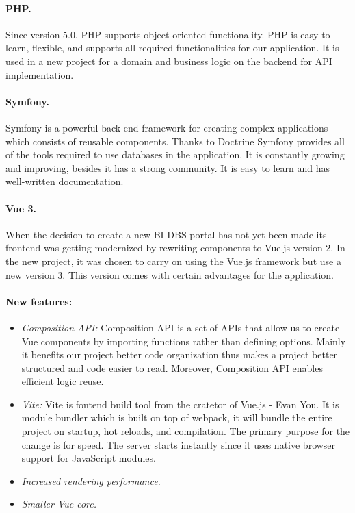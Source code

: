 \paragraph*{PHP.} Since version 5.0, PHP supports object-oriented functionality\cite{php-oop}. PHP is easy to learn, flexible, and supports all required functionalities for our application. It is used in a new project for a domain and business logic on the backend for API implementation.

\paragraph*{Symfony.} Symfony is a powerful back-end framework for creating complex applications which consists of reusable components.\cite{symphony-doc} Thanks to Doctrine Symfony provides all of the tools required to use databases in the application. It is constantly growing and improving, besides it has a strong community. It is easy to learn and has well-written documentation.


\paragraph*{Vue 3.} When the decision to create a new BI-DBS portal has not yet been made its frontend was getting modernized by rewriting components to Vue.js version 2. In the new project, it was chosen to carry on using the Vue.js framework but use a new version 3. This version comes with certain advantages for the application.\cite{vue3-updates}

\paragraph*{New features:}
\begin{itemize}
  \item \emph{Composition API:} Composition API is a set of APIs that allow us to create Vue components by importing functions rather than defining options. Mainly it benefits our project better code organization thus makes a project better structured and code easier to read. Moreover, Composition API enables efficient logic reuse.\cite{compositionapi-doc}
  
  \item \emph{Vite:} Vite is fontend build tool from the cratetor of Vue.js - Evan You. It is module bundler which is built on top of webpack, it will bundle the entire project on startup, hot reloads, and compilation. The primary purpose for the change is for speed. The server starts instantly since it uses native browser support for JavaScript modules.\cite{vite-doc}

  \item \emph{Increased rendering performance.}

  \item \emph{Smaller Vue core.}

\end{itemize}

